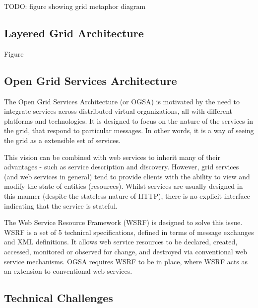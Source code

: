 \documentclass{article}
\begin{document}
TODO: figure showing grid metaphor diagram

\subsection{Layered Grid Architecture}

Figure 

\subsection{Open Grid Services Architecture}

The Open Grid Services Architecture (or OGSA) is motivated by the need to integrate services across distributed virtual organizations, all with different platforms and technologies. It is designed to focus on the nature of the services in the grid, that respond to particular messages. In other words, it is a way of seeing the grid as a extensible set of services.

This vision can be combined with web services to inherit many of their advantages - such as service description and discovery. However, grid services (and web services in general) tend to provide clients with the ability to view and modify the state of entities (resources). Whilst services are usually designed in this manner (despite the stateless nature of HTTP), there is no explicit interface indicating that the service is stateful.

The Web Service Resource Framework (WSRF) is designed to solve this issue. WSRF is a set of 5 technical specifications, defined in terms of message exchanges and XML definitions. It allows web service resources to be declared, created, accessed, monitored or observed for change, and destroyed via conventional web service mechanisms. OGSA requires WSRF to be in place, where WSRF acts as an extension to conventional web services.

\subsection{Technical Challenges}
\end{document}
